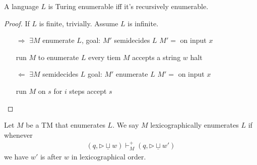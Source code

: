 \begin{theorem}
    A language $L$ is Turing enumerable iff it's recursively enumerable. 
\end{theorem}
\begin{proof}
    If $L$ is finite, trivially. Assume $L$ is infinite.
    \begin{itemize}
        \item [$\Rightarrow$] $\exists M$ enumerate $L$, 
        \subitem goal: $M'$ semidecides $L$ 
        \subitem $M'=$ on input $x$
        \begin{algorithm}[H]
            \caption{$M'$}
            \begin{algorithmic}
                \State run $M$ to enumerate $L$
                \State every tiem $M$ accepts a string $w$
                    \State halt
                \EndIf
            \end{algorithmic}
        \end{algorithm}
        \item [$\Leftarrow$] $\exists M$ semidecides $L$
        \subitem goal: $M'$ enumerate $L$
        \subitem $M'=$ on input $x$
        \begin{algorithm}[H]
            \caption{$M'$}
            \begin{algorithmic}
                        \State run $M$ on $s$ for $i$ steps
                            \State accept $s$
                        \EndIf
                    \EndFor
                \EndFor
            \end{algorithmic}
        \end{algorithm}
    \end{itemize}
\end{proof}

\begin{definition}
    Let $M$ be a TM that enumerates $L$. We say $M$ lexicographically enumerates $L$ if whenever
    \begin{align*}
        (q, \triangleright \underline{\sqcup} w)\vdash_M^+ (q,\triangleright \underline{\sqcup}w')
    \end{align*}
    we have $w'$ is after $w$ in lexicographical order. 
\end{definition}

